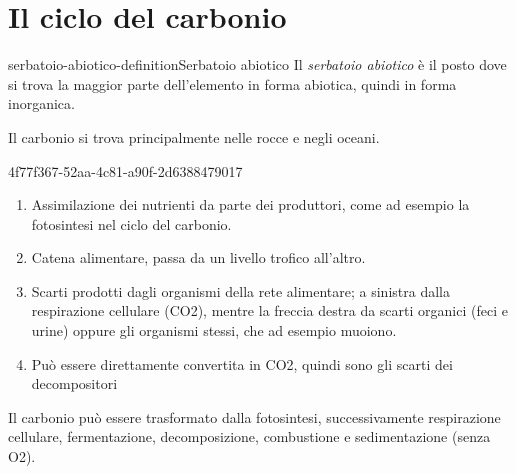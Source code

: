 \documentclass[preview]{standalone}
\begin{document}
\genpage

\section{Il ciclo del carbonio}

\begin{snippetdefinition}{serbatoio-abiotico-definition}{Serbatoio abiotico}
    Il \textit{serbatoio abiotico} 
    è il posto dove si trova la maggior parte dell'elemento in forma abiotica,
    quindi in forma inorganica.
\end{snippetdefinition}

\begin{plainhtml}
    Il carbonio si trova principalmente nelle rocce e negli oceani.
\end{plainhtml}


\begin{snippet}{4f77f367-52aa-4c81-a90f-2d6388479017}
    \begin{enumerate}
        \item Assimilazione dei nutrienti da parte dei produttori, come ad esempio la fotosintesi nel ciclo del carbonio. 
        \item Catena alimentare, passa da un livello trofico all'altro. 
        \item Scarti prodotti dagli organismi della rete alimentare; a sinistra dalla respirazione cellulare (CO2), mentre la freccia destra da scarti organici (feci e urine) oppure gli organismi stessi, che ad esempio muoiono.
        \item Può essere direttamente convertita in CO2, quindi sono gli scarti dei decompositori
    \end{enumerate}
    
    Il carbonio può essere trasformato dalla fotosintesi, successivamente 
    respirazione cellulare, fermentazione, decomposizione, combustione e sedimentazione (senza O2).
\end{snippet}
\end{document}
